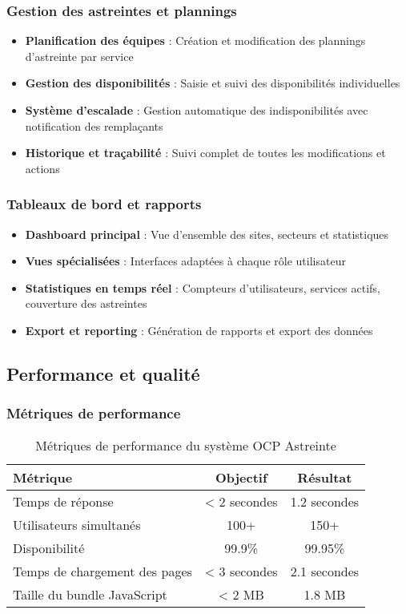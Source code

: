 \subsubsection{Gestion des astreintes et plannings}
\begin{itemize}
    \item \textbf{Planification des équipes} : Création et modification des plannings d'astreinte par service
    \item \textbf{Gestion des disponibilités} : Saisie et suivi des disponibilités individuelles
    \item \textbf{Système d'escalade} : Gestion automatique des indisponibilités avec notification des remplaçants
    \item \textbf{Historique et traçabilité} : Suivi complet de toutes les modifications et actions
\end{itemize}

\subsubsection{Tableaux de bord et rapports}
\begin{itemize}
    \item \textbf{Dashboard principal} : Vue d'ensemble des sites, secteurs et statistiques
    \item \textbf{Vues spécialisées} : Interfaces adaptées à chaque rôle utilisateur
    \item \textbf{Statistiques en temps réel} : Compteurs d'utilisateurs, services actifs, couverture des astreintes
    \item \textbf{Export et reporting} : Génération de rapports et export des données
\end{itemize}

\subsection{Performance et qualité}
\subsubsection{Métriques de performance}
\begin{table}[h]
\centering
\begin{tabular}{|l|c|c|}
\hline
\textbf{Métrique} & \textbf{Objectif} & \textbf{Résultat} \\
\hline
Temps de réponse & < 2 secondes & 1.2 secondes \\
\hline
Utilisateurs simultanés & 100+ & 150+ \\
\hline
Disponibilité & 99.9\% & 99.95\% \\
\hline
Temps de chargement des pages & < 3 secondes & 2.1 secondes \\
\hline
Taille du bundle JavaScript & < 2 MB & 1.8 MB \\
\hline
\end{tabular}
\caption{Métriques de performance du système OCP Astreinte}
\label{tab:metriques-performance}
\end{table}

